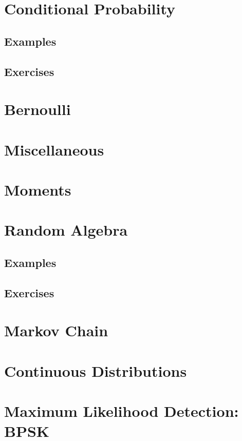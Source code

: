 \documentclass[journal]{IEEEtran}
\begin{document}
\section{Conditional Probability}
\subsection{Examples}

\subsection{Exercises}

\section{Bernoulli}


    \section{Miscellaneous}

\iffalse
\section{Moments}

\section{Random Algebra}
\subsection{Examples}

\subsection{Exercises}

\section{Markov Chain}

\section{Continuous Distributions}

\section{Maximum Likelihood Detection: BPSK}

\end{document}
